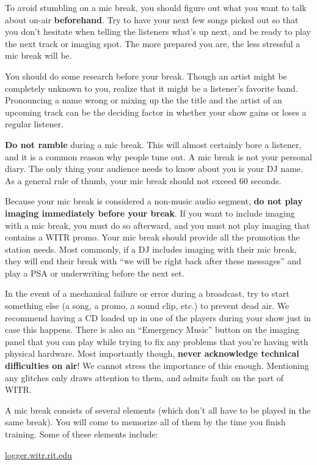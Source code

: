 \documentclass{witrman}
\begin{document}
To avoid stumbling on a mic break, you should figure out what you want to talk
about on-air \textbf{beforehand}.  Try to have your next few songs picked out so
that you don't hesitate when telling the listeners what's up next, and be ready
to play the next track or imaging spot.  The more prepared you are, the less
stressful a mic break will be.

You should do some research before your break.  Though an artist might be
completely unknown to you, realize that it might be a listener's favorite band.
Pronouncing a name wrong or mixing up the the title and the artist of an
upcoming track can be the deciding factor in whether your show gains or loses a
regular listener.

\textbf{Do not ramble} during a mic break.  This will almost certainly bore a
listener, and it is a common reason why people tune out.  A mic break is not
your personal diary.  The only thing your audience needs to know about you is
your DJ name.  As a general rule of thumb, your mic break should not exceed 60
seconds.

Because your mic break is considered a non-music audio segment, \textbf{do not
play imaging immediately before your break}.  If you want to include imaging
with a mic break, you must do so afterward, and you must not play imaging that
contains a WITR promo.  Your mic break should provide all the promotion the
station needs.  Most commonly, if a DJ includes imaging with their mic break,
they will end their break with ``we will be right back after these messages''
and play a PSA or underwriting before the next set.

In the event of a mechanical failure or error during a broadcast, try to start
something else (a song, a promo, a sound clip, etc.) to prevent dead air.  We
recommend having a CD loaded up in one of the players during your show just in
case this happens.  There is also an ``Emergency Music'' button on the imaging
panel that you can play while trying to fix any problems that you're having with
physical hardware.  Most importantly though, \textbf{never acknowledge technical
difficulties on air}!  We cannot stress the importance of this enough.
Mentioning any glitches only draws attention to them, and admits fault on the
part of WITR\@.

A mic break consists of several elements (which don't all have to be played in
the same break).  You will come to memorize all of them by the time you finish
training.  Some of these elements include:
\begin{tightitemize}
        {\href{https://logger.witr.rit.edu/}{logger.witr.rit.edu}}
\end{tightitemize}
\end{document}
